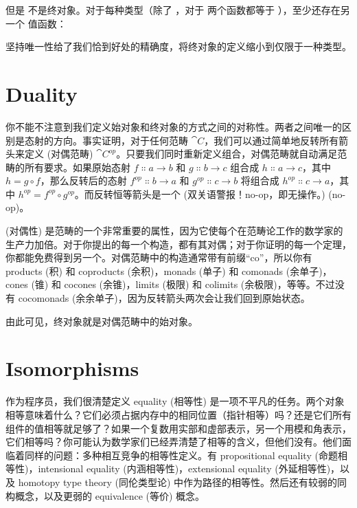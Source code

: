但是  不是终对象。对于每种类型（除了 ，对于  两个函数都等于 ），至少还存在另一个  值函数：

坚持唯一性给了我们恰到好处的精确度，将终对象的定义缩小到仅限于一种类型。

\section{Duality}

你不能不注意到我们定义始对象和终对象的方式之间的对称性。两者之间唯一的区别是态射的方向。事实证明，对于任何范畴 $\cat{C}$，我们可以通过简单地反转所有箭头来定义  (对偶范畴) $\cat{C}^\mathit{op}$。只要我们同时重新定义组合，对偶范畴就自动满足范畴的所有要求。如果原始态射 $f \Colon a \to b$ 和 $g \Colon b \to c$ 组合成 $h \Colon a \to c$，其中 $h = g \circ f$，那么反转后的态射 $f^\mathit{op} \Colon b \to a$ 和 $g^\mathit{op} \Colon c \to b$ 将组合成 $h^\mathit{op} \Colon c \to a$，其中 $h^\mathit{op} = f^\mathit{op} \circ g^\mathit{op}$。而反转恒等箭头是一个 (双关语警报！no-op，即无操作。) (no-op)。

 (对偶性) 是范畴的一个非常重要的属性，因为它使每个在范畴论工作的数学家的生产力加倍。对于你提出的每一个构造，都有其对偶；对于你证明的每一个定理，你都能免费得到另一个。对偶范畴中的构造通常带有前缀“co”，所以你有 products (积) 和 coproducts (余积)，monads (单子) 和 comonads (余单子)，cones (锥) 和 cocones (余锥)，limits (极限) 和 colimits (余极限)，等等。不过没有 cocomonads (余余单子)，因为反转箭头两次会让我们回到原始状态。

由此可见，终对象就是对偶范畴中的始对象。

\section{Isomorphisms}

作为程序员，我们很清楚定义 equality (相等性) 是一项不平凡的任务。两个对象相等意味着什么？它们必须占据内存中的相同位置（指针相等）吗？还是它们所有组件的值相等就足够了？如果一个复数用实部和虚部表示，另一个用模和角表示，它们相等吗？你可能认为数学家们已经弄清楚了相等的含义，但他们没有。他们面临着同样的问题：多种相互竞争的相等性定义。有 propositional equality (命题相等性)，intensional equality (内涵相等性)，extensional equality (外延相等性)，以及 homotopy type theory (同伦类型论) 中作为路径的相等性。然后还有较弱的同构概念，以及更弱的 equivalence (等价) 概念。

